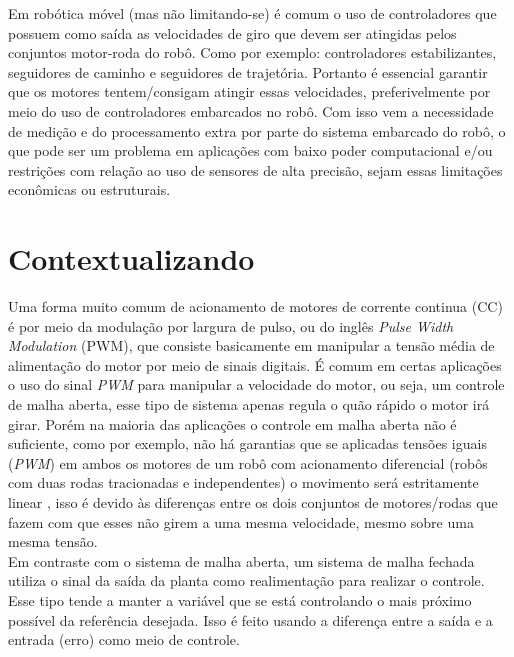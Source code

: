 Em robótica móvel (mas não limitando-se) é comum o uso de controladores que possuem como saída as velocidades de giro que devem ser atingidas pelos conjuntos motor-roda do robô. Como por exemplo: controladores estabilizantes, seguidores de caminho e seguidores de trajetória. Portanto é essencial garantir que os motores tentem/consigam atingir essas velocidades, preferivelmente por meio do uso de controladores embarcados no robô. Com isso vem a necessidade de medição e do processamento extra por parte do sistema embarcado do robô, o que pode ser um problema em aplicações com baixo poder computacional e/ou restrições com relação ao uso de sensores de alta precisão, sejam essas limitações econômicas ou estruturais.\\

\section{Contextualizando}
\label{sec:contextualizando}
Uma forma muito comum de acionamento de motores de corrente continua (CC) é por meio da modulação por largura de pulso, ou do inglês \emph{Pulse Width Modulation} (PWM), que consiste basicamente em manipular a tensão média de alimentação do motor por meio de sinais digitais. É comum em certas aplicações o uso do sinal \emph{PWM} para manipular a velocidade do motor, ou seja, um controle de malha aberta, esse tipo de sistema apenas regula o quão rápido o motor irá girar. Porém na maioria das aplicações o controle em malha aberta não é suficiente, como por exemplo, não há garantias que se aplicadas tensões iguais (\emph{PWM}) em ambos os motores de um robô com acionamento diferencial (robôs com duas rodas tracionadas e independentes) o movimento será estritamente linear \cite{simple_speed_feedback}, isso é devido às diferenças entre os dois conjuntos de motores/rodas que fazem com que esses não girem a uma mesma velocidade, mesmo sobre uma mesma tensão.\\

Em contraste com o sistema de malha aberta, um sistema de malha fechada utiliza o sinal da saída da planta como realimentação para realizar o controle. Esse tipo tende a manter a variável que se está controlando o mais próximo possível da referência desejada. Isso é feito usando a diferença entre a saída e a entrada (erro) como meio de controle. \\ %

